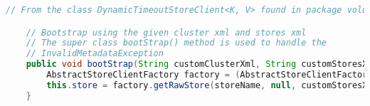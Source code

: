 \begin{lstlisting}[language=Java, caption={Demonstrasjon av casting til abstrakt klasse.}]
    // From the class DynamicTimeoutStoreClient<K, V> found in package voldemort.rest.coordinator;

    // Bootstrap using the given cluster xml and stores xml
    // The super class bootStrap() method is used to handle the
    // InvalidMetadataException
    public void bootStrap(String customClusterXml, String customStoresXml) {
        AbstractStoreClientFactory factory = (AbstractStoreClientFactory) this.storeFactory;
        this.store = factory.getRawStore(storeName, null, customStoresXml, customClusterXml, null);
    } 
\end{lstlisting}
